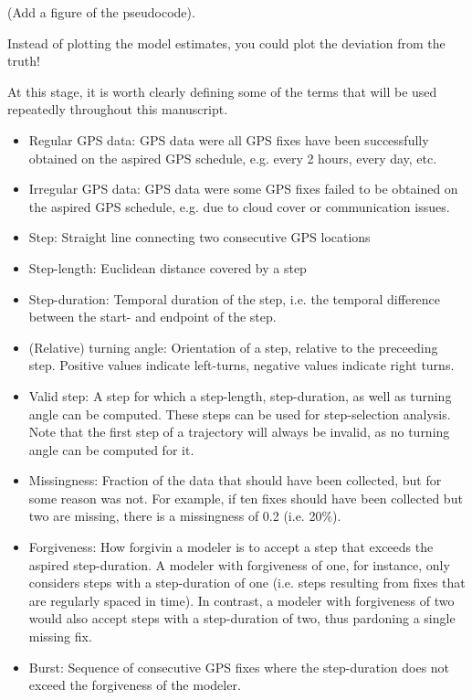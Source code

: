 \documentclass[abstract=on,10pt,a4paper,bibliography=totocnumbered]{article}
\begin{document}
(Add a figure of the pseudocode).


 Instead of plotting the model estimates, you
could plot the deviation from the truth!

At this stage, it is worth clearly defining some of the terms that will be used
repeatedly throughout this manuscript.

\begin{itemize}
  \item Regular GPS data: GPS data were all GPS fixes have been successfully
  obtained on the aspired GPS schedule, e.g. every 2 hours, every day, etc.
  \item Irregular GPS data: GPS data were some GPS fixes failed to be obtained
  on the aspired GPS schedule, e.g. due to cloud cover or communication issues.
  \item Step: Straight line connecting two consecutive GPS locations
  \item Step-length: Euclidean distance covered by a step
  \item Step-duration: Temporal duration of the step, i.e. the temporal
  difference between the start- and endpoint of the step.
  \item (Relative) turning angle: Orientation of a step, relative to the
  preceeding step. Positive values indicate left-turns, negative values indicate
  right turns.
  \item Valid step: A step for which a step-length, step-duration, as well as
  turning angle can be computed. These steps can be used for step-selection
  analysis. Note that the first step of a trajectory will always be invalid, as
  no turning angle can be computed for it.
  \item Missingness: Fraction of the data that should have been collected, but
  for some reason was not. For example, if ten fixes should have been collected
  but two are missing, there is a missingness of 0.2 (i.e. 20\%).
  \item Forgiveness: How forgivin a modeler is to accept a step that exceeds the
  aspired step-duration. A modeler with forgiveness of one, for instance, only
  considers steps with a step-duration of one (i.e. steps resulting from fixes
  that are regularly spaced in time). In contrast, a modeler with forgiveness of
  two would also accept steps with a step-duration of two, thus pardoning a
  single missing fix.
  \item Burst: Sequence of consecutive GPS fixes where the step-duration does
  not exceed the forgiveness of the modeler.
\end{itemize}
\end{document}

